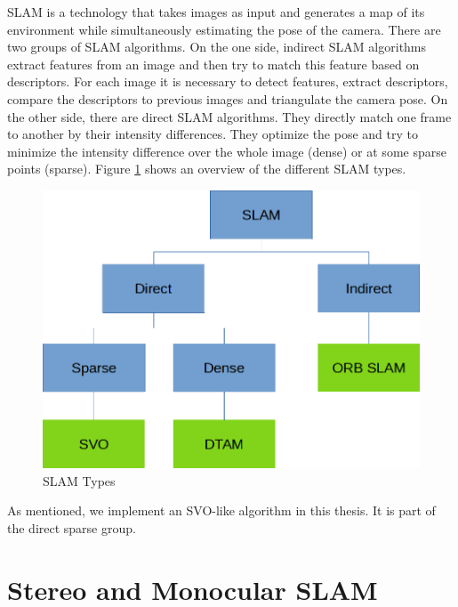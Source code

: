 \documentclass[11pt,a4paper,titlepage,oneside]{report}
\begin{document}
SLAM is a technology that takes images as input and generates a map of its environment while simultaneously estimating the pose of the camera. There are two groups of SLAM algorithms. On the one side, indirect SLAM algorithms extract features from an image and then try to match this feature based on descriptors. For each image it is necessary to detect features, extract descriptors, compare the descriptors to previous images and triangulate the camera pose. On the other side, there are direct SLAM algorithms. They directly match one frame to another by their intensity differences. They optimize the pose and try to minimize the intensity difference over the whole image (dense) or at some sparse points (sparse). Figure \ref{fig:slammodes} shows an overview of the different SLAM types.

\begin{figure}[H]
  \includegraphics[width=1.0\textwidth]{img/slam_modes.png}
  \caption{SLAM Types}\label{fig:slammodes}
\end{figure}

As mentioned, we implement an SVO-like algorithm in this thesis. It is part of the direct sparse group.

\section{Stereo and Monocular SLAM}
\end{document}

